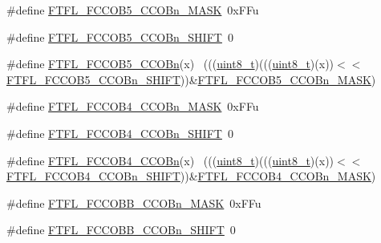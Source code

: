 \begin{DoxyCompactItemize}
\item 
\#define \hyperlink{group___f_t_f_l___register___masks_ga7b360c0830ca8e08c530a582541b8b9d}{F\+T\+F\+L\+\_\+\+F\+C\+C\+O\+B5\+\_\+\+C\+C\+O\+Bn\+\_\+\+M\+A\+SK}~0x\+F\+Fu
\item 
\#define \hyperlink{group___f_t_f_l___register___masks_gabe8f033cc629cc2da0f98d7384bcd95c}{F\+T\+F\+L\+\_\+\+F\+C\+C\+O\+B5\+\_\+\+C\+C\+O\+Bn\+\_\+\+S\+H\+I\+FT}~0
\item 
\#define \hyperlink{group___f_t_f_l___register___masks_gae31beca41bb5491b89816159cd35f2e3}{F\+T\+F\+L\+\_\+\+F\+C\+C\+O\+B5\+\_\+\+C\+C\+O\+Bn}(x)                                      ~(((\hyperlink{_p_e___types_8h_aba7bc1797add20fe3efdf37ced1182c5}{uint8\+\_\+t})(((\hyperlink{_p_e___types_8h_aba7bc1797add20fe3efdf37ced1182c5}{uint8\+\_\+t})(x))$<$$<$\hyperlink{group___f_t_f_l___register___masks_gabe8f033cc629cc2da0f98d7384bcd95c}{F\+T\+F\+L\+\_\+\+F\+C\+C\+O\+B5\+\_\+\+C\+C\+O\+Bn\+\_\+\+S\+H\+I\+FT}))\&\hyperlink{group___f_t_f_l___register___masks_ga7b360c0830ca8e08c530a582541b8b9d}{F\+T\+F\+L\+\_\+\+F\+C\+C\+O\+B5\+\_\+\+C\+C\+O\+Bn\+\_\+\+M\+A\+SK})
\item 
\#define \hyperlink{group___f_t_f_l___register___masks_gacf14a3998b383208d9afab60b561667e}{F\+T\+F\+L\+\_\+\+F\+C\+C\+O\+B4\+\_\+\+C\+C\+O\+Bn\+\_\+\+M\+A\+SK}~0x\+F\+Fu
\item 
\#define \hyperlink{group___f_t_f_l___register___masks_ga0d53c20a9a46795ddfe5bd46653d101d}{F\+T\+F\+L\+\_\+\+F\+C\+C\+O\+B4\+\_\+\+C\+C\+O\+Bn\+\_\+\+S\+H\+I\+FT}~0
\item 
\#define \hyperlink{group___f_t_f_l___register___masks_ga553af55bc5cc70f4081aad049bf2872c}{F\+T\+F\+L\+\_\+\+F\+C\+C\+O\+B4\+\_\+\+C\+C\+O\+Bn}(x)                                      ~(((\hyperlink{_p_e___types_8h_aba7bc1797add20fe3efdf37ced1182c5}{uint8\+\_\+t})(((\hyperlink{_p_e___types_8h_aba7bc1797add20fe3efdf37ced1182c5}{uint8\+\_\+t})(x))$<$$<$\hyperlink{group___f_t_f_l___register___masks_ga0d53c20a9a46795ddfe5bd46653d101d}{F\+T\+F\+L\+\_\+\+F\+C\+C\+O\+B4\+\_\+\+C\+C\+O\+Bn\+\_\+\+S\+H\+I\+FT}))\&\hyperlink{group___f_t_f_l___register___masks_gacf14a3998b383208d9afab60b561667e}{F\+T\+F\+L\+\_\+\+F\+C\+C\+O\+B4\+\_\+\+C\+C\+O\+Bn\+\_\+\+M\+A\+SK})
\item 
\#define \hyperlink{group___f_t_f_l___register___masks_ga00aef335772d6ebee4d1e0fbeda40c7d}{F\+T\+F\+L\+\_\+\+F\+C\+C\+O\+B\+B\+\_\+\+C\+C\+O\+Bn\+\_\+\+M\+A\+SK}~0x\+F\+Fu
\item 
\#define \hyperlink{group___f_t_f_l___register___masks_ga067fddda40a93b82c28ccc4ce3a953bd}{F\+T\+F\+L\+\_\+\+F\+C\+C\+O\+B\+B\+\_\+\+C\+C\+O\+Bn\+\_\+\+S\+H\+I\+FT}~0

\end{DoxyCompactItemize}
